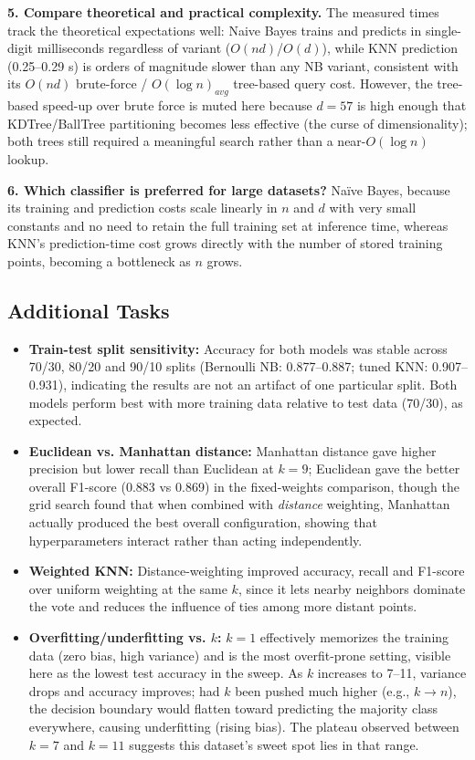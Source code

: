 \documentclass[12pt,a4paper]{article}
\begin{document}
\textbf{5. Compare theoretical and practical complexity.} The measured times track the
theoretical expectations well: Naive Bayes trains and predicts in single-digit
milliseconds regardless of variant ($O(nd)$/$O(d)$), while KNN prediction (0.25--0.29 s)
is orders of magnitude slower than any NB variant, consistent with its $O(nd)$
brute-force / $O(\log n)_{avg}$ tree-based query cost. However, the tree-based speed-up
over brute force is muted here because $d=57$ is high enough that KDTree/BallTree
partitioning becomes less effective (the curse of dimensionality); both trees still
required a meaningful search rather than a near-$O(\log n)$ lookup.

\textbf{6. Which classifier is preferred for large datasets?} Na\"ive Bayes, because its
training and prediction costs scale linearly in $n$ and $d$ with very small constants
and no need to retain the full training set at inference time, whereas KNN's
prediction-time cost grows directly with the number of stored training points,
becoming a bottleneck as $n$ grows.

\subsection*{Additional Tasks}
\begin{itemize}
\item \textbf{Train-test split sensitivity:} Accuracy for both models was stable across
70/30, 80/20 and 90/10 splits (Bernoulli NB: 0.877--0.887; tuned KNN: 0.907--0.931),
indicating the results are not an artifact of one particular split. Both models perform
best with more training data relative to test data (70/30), as expected.
\item \textbf{Euclidean vs. Manhattan distance:} Manhattan distance gave higher
precision but lower recall than Euclidean at $k=9$; Euclidean gave the better overall
F1-score (0.883 vs 0.869) in the fixed-weights comparison, though the grid search found
that when combined with \emph{distance} weighting, Manhattan actually produced the best
overall configuration, showing that hyperparameters interact rather than acting
independently.
\item \textbf{Weighted KNN:} Distance-weighting improved accuracy, recall and F1-score
over uniform weighting at the same $k$, since it lets nearby neighbors dominate the vote
and reduces the influence of ties among more distant points.
\item \textbf{Overfitting/underfitting vs. $k$:} $k=1$ effectively memorizes the
training data (zero bias, high variance) and is the most overfit-prone setting, visible
here as the lowest test accuracy in the sweep. As $k$ increases to 7--11, variance drops
and accuracy improves; had $k$ been pushed much higher (e.g., $k \to n$), the decision
boundary would flatten toward predicting the majority class everywhere, causing
underfitting (rising bias). The plateau observed between $k=7$ and $k=11$ suggests this
dataset's sweet spot lies in that range.
\end{itemize}
\end{document}
